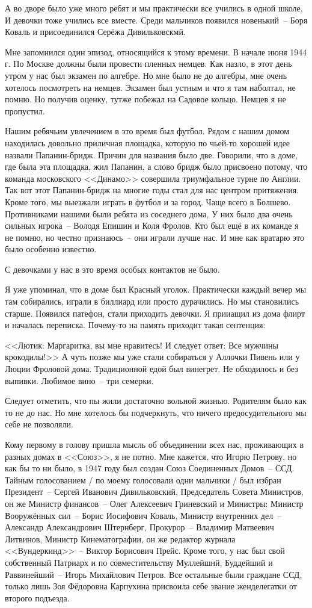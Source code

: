 А во дворе было уже много ребят и мы практически все учились в одной школе. И девочки тоже учились все вместе. Среди мальчиков появился новенький~-- Боря Коваль и присоединился Серёжа Дивильковскмй.

Мне запомнился один эпизод, относящийся к этому времени. В начале июня 1944 г. По Москве должны были провести пленных немцев. Как назло, в этот день утром у нас был экзамен по алгебре. Но мне было не до алгебры, мне очень хотелось посмотреть на немцев. Экзамен был устным и что я там наболтал, не помню. Но получив оценку, тутже побежал на Садовое кольцо. Немцев я не пропустил.

Нашим ребячьим увлечением в это время был футбол. Рядом с нашим домом находилась довольно приличная площадка, которую по чьей-то хорошей идее назвали Папанин-бридж. Причин для названия было две. Говорили, что в доме, где была эта площадка, жил Папанин, а слово бридж было присвоено потому, что команда московского <<Динамо>> совершила триумфальное турне по Англии. Так вот этот Папанин-бридж на многие годы стал для нас центром притяжения. Кроме того, мы выезжали играть в футбол и за город. Чаще всего в Болшево. Противниками нашими были ребята из соседнего дома, У них было два очень сильных игрока~-- Володя Епишин и Коля Фролов. Кто был ещё в их команде я не помню, но честно признаюсь~-- они играли лучше нас. И мне как вратарю это было особенно известно.

С девочками у нас в это время особых контактов не было.

Я уже упоминал, что в доме был Красный уголок. Практически каждый вечер мы там собирались, играли в биллиард или просто дурачились. Но мы становились старше. Появился патефон, стали приходить девочки. Я прииащил из дома флирт и началась переписка. Почему-то на память приходит такая сентенция:

<<Лютик: Маргаритка, вы мне нравитесь! И следует ответ: Все мужчины крокодилы!>> А чуть позже мы уже стали собираться у Аллочки Пивень или у Люции Фроловой дома. Традиционной едой был винегрет. Не обходилось и без выпивки. Любимое вино~-- три семерки.

Следует отметить, что пы жили достаточно вольной жизнью. Родителям было как то не до нас. Но мне хотелось бы подчеркнуть, что ничего предосудительного мы
себе не позволяли.

Кому первому в голову пришла мысль об объединении всех нас, проживающих в разных домах в <<Союз>>, я не потно. Мне кажется, что Игорю Петрову, но как бы то ни было, в 1947 году был создан Союз Соединенных Домов~-- ССД. Тайным голосованием / по моему голосовали одни мальчики / был избран Президент~-- Сергей Иванович Дивильковский, Председатель Совета Министров, он же Министр финансов~-- Олег Алексеевич Гриневский и Министры: Министр Вооружённых сил~-- Борис Иосифович Коваль, Министр внутренних дел~-- Александр Александрович Штернберг, Прокурор~-- Владимир Матвеевич Литвинов, Министр Кинематографии, он же редактор журнала <<Вундеркинд>>~-- Виктор Борисович Прейс. Кроме того, у нас был свой собственный Патриарх и по совместительству Муллейшнй, Буддейший и Раввинейший~-- Игорь Михайлович Петров. Все остальные были граждане ССД, только лишь Зоя Фёдоровна Карпухина присвоила себе звание женделегатки от второго подъезда.


